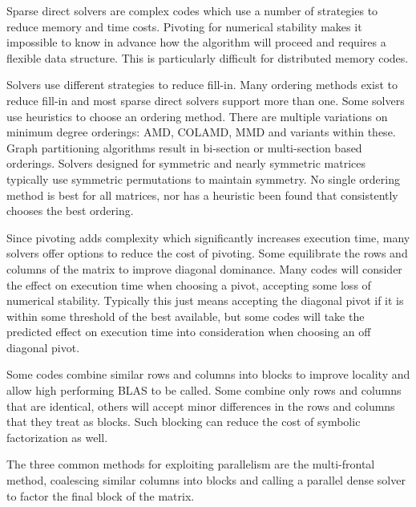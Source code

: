 \documentclass[acmtocl]{acmtrans2m}
\begin{document}
\bigskip

Sparse direct solvers are complex codes which use a number of
strategies to reduce memory and time costs.  Pivoting for numerical
stability makes it impossible to know in advance how the algorithm
will proceed and requires a flexible data structure.  This is
particularly difficult for distributed memory codes.  

Solvers use different strategies to reduce fill-in.  Many ordering
methods exist to reduce fill-in and most sparse direct solvers support
more than one.  Some solvers use heuristics to choose an ordering method.  There are multiple variations on minimum degree orderings: AMD,
COLAMD, MMD and variants within these.  Graph partitioning algorithms
result in bi-section or multi-section based orderings.  Solvers
designed for symmetric and nearly symmetric matrices typically use
symmetric permutations to maintain symmetry.  No single ordering
method is best for all matrices, nor has a heuristic been found that
consistently chooses the best ordering.

Since pivoting adds complexity which significantly increases execution
time, many solvers offer options to reduce the cost of pivoting.  Some
equilibrate the rows and columns of the matrix to improve diagonal
dominance.  Many codes will consider the effect on execution time when
choosing a pivot, accepting some loss of numerical stability.
Typically this just means accepting the diagonal pivot if it is within
some threshold of the best available, but some codes will take the
predicted effect on execution time into consideration when choosing an off
diagonal pivot.

Some codes combine similar rows and columns into blocks to improve
locality and allow high performing BLAS to be called.  Some combine
only rows and columns that are identical, others will accept minor
differences in the rows and columns that they treat as blocks.  Such
blocking can reduce the cost of symbolic factorization as well.

The three common methods for exploiting parallelism are the
multi-frontal method, coalescing  similar 
columns into blocks and calling a parallel dense solver 
to factor the final block of the matrix.

%
\end{document}
